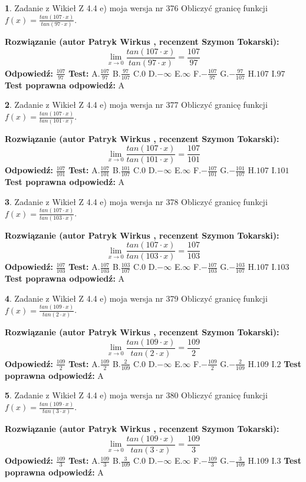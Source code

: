 \documentclass[12pt, a4paper]{article}
\theoremstyle{definition} %
\newtheorem{zad}{}
\newcommand{\zadStart}[1]{\begin{zad}#1\newline}
\newcommand{\zadStop}{\end{zad}}
\newcommand{\rozwStart}[2]{\noindent \textbf{Rozwiązanie (autor #1 , recenzent #2): }\newline}
\newcommand{\rozwStop}{\newline}
\newcommand{\odpStart}{\noindent \textbf{Odpowiedź:}\newline}
\newcommand{\odpStop}{\newline}
\newcommand{\testStart}{\noindent \textbf{Test:}\newline}
\newcommand{\testStop}{\newline}
\newcommand{\kluczStart}{\noindent \textbf{Test poprawna odpowiedź:}\newline}
\newcommand{\kluczStop}{\newline}
\begin{document}
\zadStart{Zadanie z Wikieł Z 4.4 e) moja wersja nr 376}
Obliczyć granicę funkcji $f(x)=\frac{tan(107\cdot x)}{tan(97\cdot x)}$.
\zadStop
\rozwStart{Patryk Wirkus}{Szymon Tokarski}
$$\lim\limits_{x\to 0}\frac{tan(107\cdot x)}{tan(97\cdot x)}=
\frac{107}{97}$$
\rozwStop
\odpStart
$\frac{107}{97}$
\odpStop
\testStart
A.$\frac{107}{97}$
B.$\frac{97}{107}$
C.$0$
D.$-\infty$
E.$\infty$
F.$-\frac{107}{97}$
G.$-\frac{97}{107}$
H.$107$
I.$97$
\testStop
\kluczStart
A
\kluczStop



\zadStart{Zadanie z Wikieł Z 4.4 e) moja wersja nr 377}
Obliczyć granicę funkcji $f(x)=\frac{tan(107\cdot x)}{tan(101\cdot x)}$.
\zadStop
\rozwStart{Patryk Wirkus}{Szymon Tokarski}
$$\lim\limits_{x\to 0}\frac{tan(107\cdot x)}{tan(101\cdot x)}=
\frac{107}{101}$$
\rozwStop
\odpStart
$\frac{107}{101}$
\odpStop
\testStart
A.$\frac{107}{101}$
B.$\frac{101}{107}$
C.$0$
D.$-\infty$
E.$\infty$
F.$-\frac{107}{101}$
G.$-\frac{101}{107}$
H.$107$
I.$101$
\testStop
\kluczStart
A
\kluczStop



\zadStart{Zadanie z Wikieł Z 4.4 e) moja wersja nr 378}
Obliczyć granicę funkcji $f(x)=\frac{tan(107\cdot x)}{tan(103\cdot x)}$.
\zadStop
\rozwStart{Patryk Wirkus}{Szymon Tokarski}
$$\lim\limits_{x\to 0}\frac{tan(107\cdot x)}{tan(103\cdot x)}=
\frac{107}{103}$$
\rozwStop
\odpStart
$\frac{107}{103}$
\odpStop
\testStart
A.$\frac{107}{103}$
B.$\frac{103}{107}$
C.$0$
D.$-\infty$
E.$\infty$
F.$-\frac{107}{103}$
G.$-\frac{103}{107}$
H.$107$
I.$103$
\testStop
\kluczStart
A
\kluczStop



\zadStart{Zadanie z Wikieł Z 4.4 e) moja wersja nr 379}
Obliczyć granicę funkcji $f(x)=\frac{tan(109\cdot x)}{tan(2\cdot x)}$.
\zadStop
\rozwStart{Patryk Wirkus}{Szymon Tokarski}
$$\lim\limits_{x\to 0}\frac{tan(109\cdot x)}{tan(2\cdot x)}=
\frac{109}{2}$$
\rozwStop
\odpStart
$\frac{109}{2}$
\odpStop
\testStart
A.$\frac{109}{2}$
B.$\frac{2}{109}$
C.$0$
D.$-\infty$
E.$\infty$
F.$-\frac{109}{2}$
G.$-\frac{2}{109}$
H.$109$
I.$2$
\testStop
\kluczStart
A
\kluczStop



\zadStart{Zadanie z Wikieł Z 4.4 e) moja wersja nr 380}
Obliczyć granicę funkcji $f(x)=\frac{tan(109\cdot x)}{tan(3\cdot x)}$.
\zadStop
\rozwStart{Patryk Wirkus}{Szymon Tokarski}
$$\lim\limits_{x\to 0}\frac{tan(109\cdot x)}{tan(3\cdot x)}=
\frac{109}{3}$$
\rozwStop
\odpStart
$\frac{109}{3}$
\odpStop
\testStart
A.$\frac{109}{3}$
B.$\frac{3}{109}$
C.$0$
D.$-\infty$
E.$\infty$
F.$-\frac{109}{3}$
G.$-\frac{3}{109}$
H.$109$
I.$3$
\testStop
\kluczStart
A
\kluczStop
\end{document}
